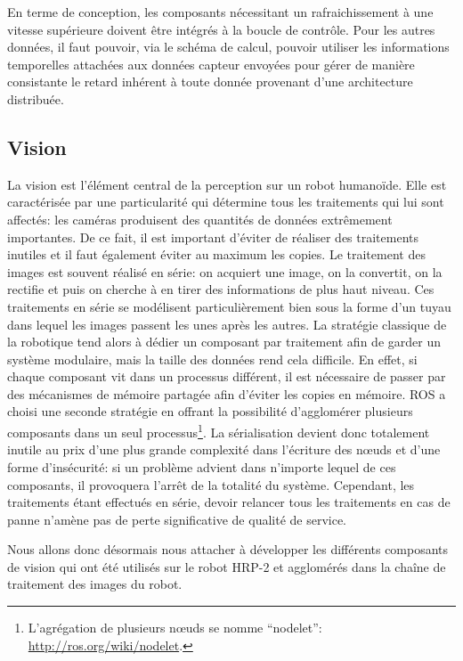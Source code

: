 En terme de conception, les composants nécessitant un rafraichissement
à une vitesse supérieure doivent être intégrés à la boucle de
contrôle. Pour les autres données, il faut pouvoir, via le schéma de
calcul, pouvoir utiliser les informations temporelles attachées aux
données capteur envoyées pour gérer de manière consistante le retard
inhérent à toute donnée provenant d'une architecture distribuée.


\subsection{Vision}


La vision est l'élément central de la
perception sur un robot humanoïde. Elle est caractérisée par une
particularité qui détermine tous les traitements qui lui sont
affectés: les caméras produisent des quantités de données extrêmement
importantes. De ce fait, il est important d'éviter de réaliser des
traitements inutiles et il faut également éviter au maximum les
copies. Le traitement des images est souvent réalisé en série: on
acquiert une image, on la convertit, on la rectifie et puis on cherche
à en tirer des informations de plus haut niveau. Ces traitements en
série se modélisent particulièrement bien sous la forme d'un tuyau
dans lequel les images passent les unes après les autres. La stratégie
classique de la robotique tend alors à dédier un composant par
traitement afin de garder un système modulaire, mais la taille des
données rend cela difficile. En effet, si chaque composant vit dans un
processus différent, il est nécessaire de passer par des mécanismes de
mémoire partagée afin d'éviter les copies en mémoire. ROS a choisi une
seconde stratégie en offrant la possibilité d'agglomérer plusieurs
composants dans un seul processus\footnote{L'agrégation de plusieurs
  n\oe uds se nomme ``nodelet'':
  \url{http://ros.org/wiki/nodelet}.}. La sérialisation devient donc
totalement inutile au prix d'une plus grande complexité dans
l'écriture des n\oe uds et d'une forme d'insécurité: si un problème
advient dans n'importe lequel de ces composants, il provoquera l'arrêt
de la totalité du système. Cependant, les traitements étant effectués
en série, devoir relancer tous les traitements en cas de panne n'amène
pas de perte significative de qualité de service.


Nous allons donc désormais nous attacher à développer les différents
composants de vision qui ont été utilisés sur le robot
HRP-2 et agglomérés dans la chaîne de traitement des
images du robot.


